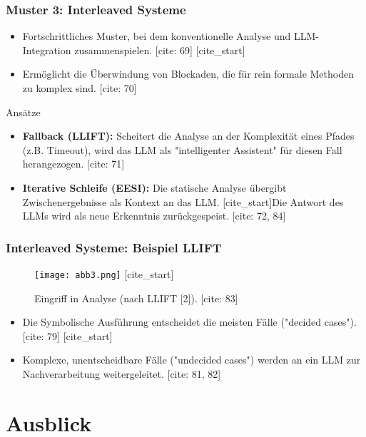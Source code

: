 \documentclass{beamer}
\begin{document}
\begin{frame}
\frametitle{Muster 3: Interleaved Systeme}
\begin{itemize}
    [cite_start]\item Fortschrittliches Muster, bei dem konventionelle Analyse und LLM-Integration zusammenspielen. [cite: 69]
    [cite_start]\item Ermöglicht die Überwindung von Blockaden, die für rein formale Methoden zu komplex sind. [cite: 70]
\end{itemize}
\pause
\begin{block}{Ansätze}
\begin{itemize}
    [cite_start]\item \textbf{Fallback (LLIFT):} Scheitert die Analyse an der Komplexität eines Pfades (z.B. Timeout), wird das LLM als "intelligenter Assistent" für diesen Fall herangezogen. [cite: 71]
    \item \textbf{Iterative Schleife (EESI):} Die statische Analyse übergibt Zwischenergebnisse als Kontext an das LLM. [cite_start]Die Antwort des LLMs wird als neue Erkenntnis zurückgespeist. [cite: 72, 84]
\end{itemize}
\end{block}
\end{frame}

\begin{frame}
\frametitle{Interleaved Systeme: Beispiel LLIFT}
\begin{figure}
    \texttt{[image: abb3.png]}
    [cite_start]\caption{Eingriff in Analyse (nach LLIFT [2]). [cite: 83]}
\end{figure}
\begin{itemize}
    [cite_start]\item Die Symbolische Ausführung entscheidet die meisten Fälle ("decided cases"). [cite: 79]
    [cite_start]\item Komplexe, unentscheidbare Fälle ("undecided cases") werden an ein LLM zur Nachverarbeitung weitergeleitet. [cite: 81, 82]
\end{itemize}
\end{frame}

\section{Ausblick}
\end{document}
